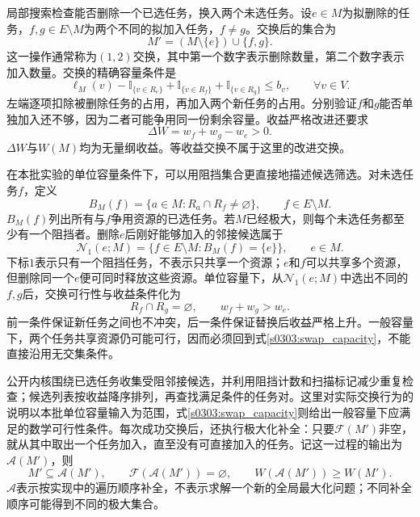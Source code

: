 局部搜索检查能否删除一个已选任务，换入两个未选任务。设$e\in M$为拟删除的任务，$f,g\in E\setminus M$为两个不同的拟加入任务，$f\ne g$。交换后的集合为
\begin{equation}
 M'=(M\setminus\{e\})\cup\{f,g\}.
 \label{s0303:swap_set}
\end{equation}
这一操作通常称为$(1,2)$交换，其中第一个数字表示删除数量，第二个数字表示加入数量。交换的精确容量条件是
\begin{equation}
 \ell_M(v)-\mathbb{I}_{\{v\in R_e\}}
 +\mathbb{I}_{\{v\in R_f\}}
 +\mathbb{I}_{\{v\in R_g\}}
 \leq b_v,
 \qquad\forall v\in V.
 \label{s0303:swap_capacity}
\end{equation}
左端逐项扣除被删除任务的占用，再加入两个新任务的占用。分别验证$f$和$g$能否单独加入还不够，因为二者可能争用同一份剩余容量。收益严格改进还要求
\begin{equation}
 \Delta W=w_f+w_g-w_e>0.
 \label{s0303:swap_gain}
\end{equation}
$\Delta W$与$W(M)$均为无量纲收益。等收益交换不属于这里的改进交换。

在本批实验的单位容量条件下，可以用阻挡集合更直接地描述候选筛选。对未选任务$f$，定义
\begin{equation}
 B_M(f)=\{a\in M:R_a\cap R_f\ne\varnothing\},
 \qquad f\in E\setminus M.
 \label{s0303:blockers}
\end{equation}
$B_M(f)$列出所有与$f$争用资源的已选任务。若$M$已经极大，则每个未选任务都至少有一个阻挡者。删除$e$后刚好能够加入的邻接候选属于
\begin{equation}
 \mathcal{N}_1(e;M)=
 \{f\in E\setminus M:B_M(f)=\{e\}\},
 \qquad e\in M.
 \label{s0303:one_blocker}
\end{equation}
下标$1$表示只有一个阻挡任务，不表示只共享一个资源；$e$和$f$可以共享多个资源，但删除同一个$e$便可同时释放这些资源。单位容量下，从$\mathcal{N}_1(e;M)$中选出不同的$f,g$后，交换可行性与收益条件化为
\begin{equation}
 R_f\cap R_g=\varnothing,
 \qquad w_f+w_g>w_e.
 \label{s0303:unit_swap}
\end{equation}
前一条件保证新任务之间也不冲突，后一条件保证替换后收益严格上升。一般容量下，两个任务共享资源仍可能可行，因而必须回到式\eqref{s0303:swap_capacity}，不能直接沿用无交集条件。

公开内核围绕已选任务收集受阻邻接候选，并利用阻挡计数和扫描标记减少重复检查；候选列表按收益降序排列，再查找满足条件的任务对。这里对实际交换行为的说明以本批单位容量输入为范围，式\eqref{s0303:swap_capacity}则给出一般容量下应满足的数学可行性条件。每次成功交换后，还执行极大化补全：只要$\mathcal{F}(M')$非空，就从其中取出一个任务加入，直至没有可直接加入的任务。记这一过程的输出为$\mathcal{A}(M')$，则
\begin{equation}
 M'\subseteq\mathcal{A}(M'),\qquad
 \mathcal{F}(\mathcal{A}(M'))=\varnothing,\qquad
 W(\mathcal{A}(M'))\geq W(M').
 \label{s0303:maximize}
\end{equation}
$\mathcal{A}$表示按实现中的遍历顺序补全，不表示求解一个新的全局最大化问题；不同补全顺序可能得到不同的极大集合。

